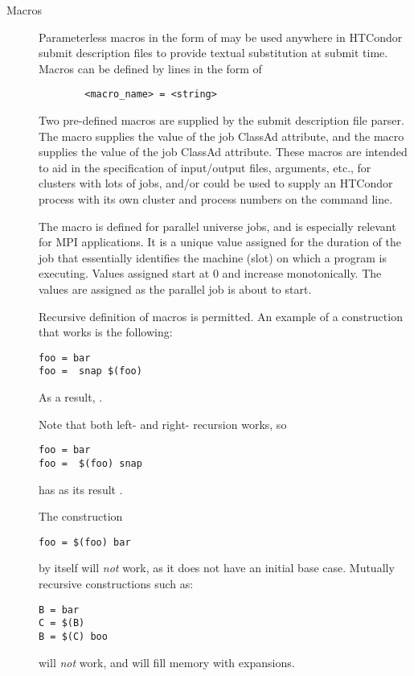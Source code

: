 \begin{description}

\item[Macros] Parameterless macros in the form of 
may be used anywhere in HTCondor submit description files
to provide textual substitution at submit time.
Macros can be defined by lines in the form of 
\begin{verbatim} 
        <macro_name> = <string> 
\end{verbatim} 
Two pre-defined macros are supplied by the submit description file parser.
The
 macro supplies the value of the
 job
ClassAd attribute, and the
 macro supplies the value of the
 job
ClassAd attribute.
These macros are
intended to aid in the specification of input/output files, arguments,
etc., for clusters with lots of jobs, and/or could be used to supply an
HTCondor process with its own cluster and process numbers on the command
line.

The  macro is defined for parallel universe jobs,
and is especially relevant for MPI applications.
It is a unique value assigned for the duration of the job
that essentially identifies the machine (slot) on which a program is
executing.
Values assigned start at 0 and increase monotonically.
The values are assigned as the parallel job is about to start.

Recursive definition of macros is permitted.
An example of a construction that works is the following: 
\begin{verbatim}
foo = bar
foo =  snap $(foo)
\end{verbatim}
As a result, .

Note that both left- and right- recursion works, so 
\begin{verbatim}
foo = bar
foo =  $(foo) snap
\end{verbatim}
has as its result .

The construction 
\begin{verbatim}
foo = $(foo) bar 
\end{verbatim}
by itself will \emph{not} work, as it does not have an initial base case.
Mutually recursive constructions such as: 
\begin{verbatim}
B = bar 
C = $(B)
B = $(C) boo
\end{verbatim}
will \emph{not} work, and will fill memory with expansions.


\end{description}
